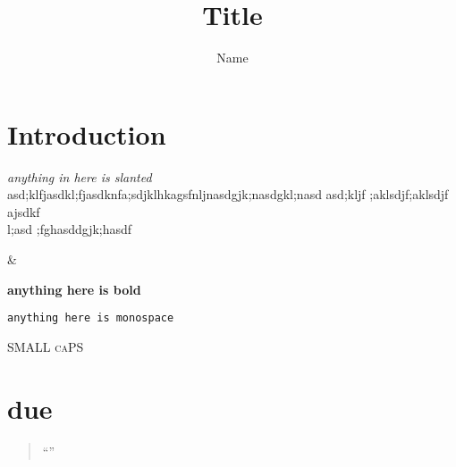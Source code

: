 \documentclass[letterpaper,12pt,twoside]{article}
\title{\sc Title}
\author{Name}
\date{\runCourse} %
\begin{document}
\doublespace

\maketitle

\section*{Introduction}

\textit{anything in here is slanted} asd;klfjasdkl;fjasdknfa;sdjklhkagsfnljnasdgjk;nasdgkl;nasd asd;kljf ;aklsdjf;aklsdjf ajsdkf \\ l;asd ;fghasddgjk;hasdf

&

\textbf{anything here is bold}

\texttt{anything here is monospace}

\textsc{SMALL caPS}



\section{due}
\lipsum[1]\autocite{fukuyama1989end}

\lipsum[1]\autocite[10]{fukuyama1989end}

\begin{quote}
\singlespace

``\lipsum[1]''


\end{quote}

\begin{multicols}{2}

\lipsum

\end{multicols}


\nocite{kreps}
  \nocite{kreps}
  \nocite{hazelton}
  \nocite{horowitzchina}
  \nocite{shah2018us}
  \nocite{yousaf}
  \nocite{cronin}
  \nocite{goldbergdronedispatch}
  \nocite{rigterink2021wane}
  \nocite{fisk2019emotions}
  \nocite{borg2020assembling}
  \nocite{bachman2017nyt}
  \nocite{johnston2016impact}
\pagebreak

{\singlespace \printbibliography[title=Bibliography]}
\end{document}
